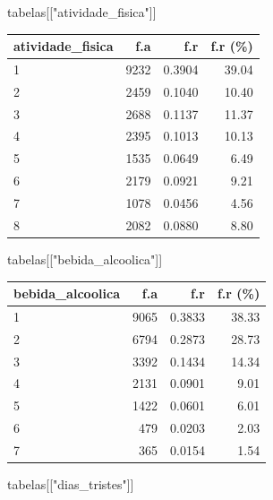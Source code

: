 \documentclass[
]{article}
\newenvironment{Shaded}{\begin{snugshade}}{\end{snugshade}}
\newcommand{\NormalTok}[1]{\textcolor[rgb]{0.00,0.23,0.31}{#1}}
\newcommand{\StringTok}[1]{\textcolor[rgb]{0.13,0.47,0.30}{#1}}
\begin{document}
\begin{Shaded}
\begin{Highlighting}[]
\NormalTok{tabelas[[}\StringTok{"atividade\_fisica"}\NormalTok{]]}
\end{Highlighting}
\end{Shaded}

\begin{longtable}[]{@{}lrrr@{}}
\toprule()
atividade\_fisica & f.a & f.r & f.r (\%) \\
\midrule()
\endhead
1 & 9232 & 0.3904 & 39.04 \\
2 & 2459 & 0.1040 & 10.40 \\
3 & 2688 & 0.1137 & 11.37 \\
4 & 2395 & 0.1013 & 10.13 \\
5 & 1535 & 0.0649 & 6.49 \\
6 & 2179 & 0.0921 & 9.21 \\
7 & 1078 & 0.0456 & 4.56 \\
8 & 2082 & 0.0880 & 8.80 \\
\bottomrule()
\end{longtable}

\begin{Shaded}
\begin{Highlighting}[]
\NormalTok{tabelas[[}\StringTok{"bebida\_alcoolica"}\NormalTok{]]}
\end{Highlighting}
\end{Shaded}

\begin{longtable}[]{@{}lrrr@{}}
\toprule()
bebida\_alcoolica & f.a & f.r & f.r (\%) \\
\midrule()
\endhead
1 & 9065 & 0.3833 & 38.33 \\
2 & 6794 & 0.2873 & 28.73 \\
3 & 3392 & 0.1434 & 14.34 \\
4 & 2131 & 0.0901 & 9.01 \\
5 & 1422 & 0.0601 & 6.01 \\
6 & 479 & 0.0203 & 2.03 \\
7 & 365 & 0.0154 & 1.54 \\
\bottomrule()
\end{longtable}

\begin{Shaded}
\begin{Highlighting}[]
\NormalTok{tabelas[[}\StringTok{"dias\_tristes"}\NormalTok{]]}
\end{Highlighting}
\end{Shaded}
\end{document}
